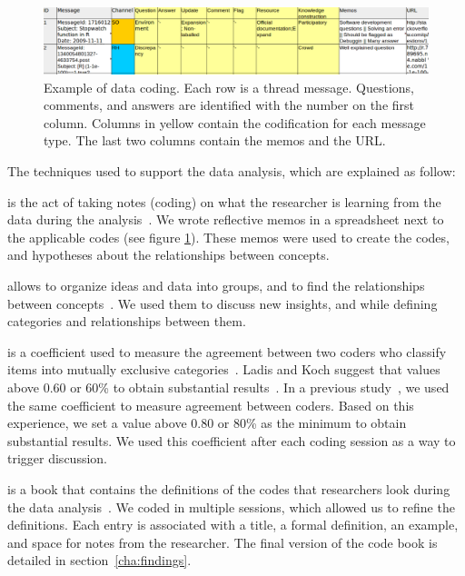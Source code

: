     \begin{figure}[htbp]
    	\centering
    	\includegraphics[width=.95\textwidth]{Figures/CodingExample}
    	\caption{Example of data coding. Each row is a thread message. Questions, comments, and answers are identified with the number on the first column. Columns in yellow contain the codification for each message type. The last two columns contain the memos and the URL.}
    	\label{fig:CodingExample}
    \end{figure}


    The techniques used to support the data analysis, which are explained as follow:

	\begin{description}[itemsep=2pt, topsep=0pt, leftmargin=1em, parsep=0pt]
		\item[Memoing] is the act of taking notes (coding) on what the researcher is learning from the data during the analysis~\cite{Groenewald2008}.
        We wrote reflective memos in a spreadsheet next to the applicable codes (see figure \ref{fig:CodingExample}).
        These memos were used to create the codes, and hypotheses about the relationships between concepts.

		\item[Affinity diagrams] allows to organize ideas and data into groups, and to find the relationships between concepts~\cite{Scupin1997}.
		We used them to discuss new insights, and while defining categories and relationships between them.

		\item[Inter-rater agreement \textit{Cohen Kappa}] is a coefficient used to measure the agreement between two coders who classify items into mutually exclusive categories~\cite{Stemler2004}.
		Ladis and Koch suggest that values above 0.60 or 60\% to obtain substantial results~\cite{Landis1977}.
		In a previous study~\cite{Gomez2013}, we used the same coefficient to measure agreement between coders.
		Based on this experience, we set a value above 0.80 or 80\% as the minimum to obtain substantial results.
		We used this coefficient after each coding session as a way to trigger discussion.

		\item[Code book] is a book that contains the definitions of the codes that researchers look during the data analysis~\cite{MacQueen1998}.
		We coded in multiple sessions, which allowed us to refine the definitions.
		Each entry is associated with a title, a formal definition, an example, and space for notes from the researcher.
		The final version of the code book is detailed in section~\ref{cha:findings}.
	\end{description}

